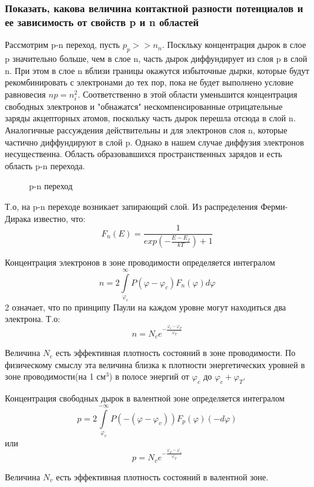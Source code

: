 \subsubsection{Показать, какова величина контактной разности потенциалов и ее зависимость от свойств p и n областей}

Рассмотрим p-n переход, пусть $p_p >> n_n$. Поскльку концентрация дырок в слое p значительно больше, чем в слое n, часть дырок диффундирует из слоя p в слой n. При этом в слое n вблизи границы окажутся избыточные дырки, которые будут рекомбинировать с электронами до тех пор, пока не будет выполнено условие равновесия $np = n_i^2$. Соответственно в этой области уменьшится концентрация свободных электронов и "обнажатся" нескомпенсированные отрицательные заряды акцепторных атомов, поскольку часть дырок перешла отсюда в слой n. Аналогичные рассуждения действительны и для электронов слоя n, которые частично диффундируют в слой p. Однако в нашем случае диффузия электронов несущественна. Область образовавшихся пространственных зарядов и есть область p-n перехода.

\begin{center}
	\begin{figure}[h!]
		\caption{p-n переход}	
		\label{2D}
	\end{figure}
\end{center}

Т.о, на p-n переходе возникает запирающий слой. Из распределения Ферми-Дирака известно, что:
$$
F_n(E) = \frac{1}{exp\left(-\frac{E-E_f}{kT} \right) + 1}
$$

Концентрация электронов в зоне проводимости определяется интегралом
$$
n = 2\int \limits_{\varphi_c}^{\infty} P(\varphi-\varphi_c)F_n(\varphi)d\varphi
$$
2 означает, что по принципу Паули на каждом уровне могут находиться два электрона. Т.о:
$$
n = N_ce^{-\frac{\varphi_c - \varphi_F}{\varphi_T}}
$$

Величина $N_c$ есть эффективная плотность состояний в зоне проводимости. По физическому смыслу эта величина близка к плотности энергетических уровней в зоне проводимости(на 1 $\textit{см}^3$) в полосе энергий от $\varphi_c$ до $\varphi_c + \varphi_T$.

Концентрация свободных дырок в валентной зоне определяется интегралом
$$
p = 2\int \limits_{\varphi_v}^{-\infty} P(-(\varphi-\varphi_v))F_p(\varphi)(-d\varphi)
$$ 
или
$$
p = N_ve^{-\frac{\varphi_F - \varphi_v}{\varphi_T}}
$$

Величина $N_v$ есть эффективная плотность состояний в валентной зоне.

